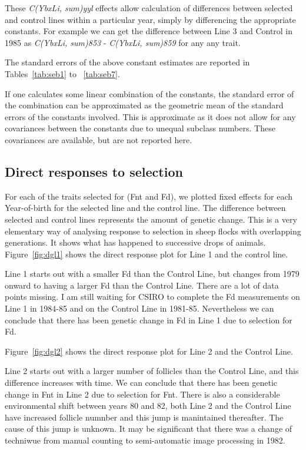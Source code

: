 \documentclass[titlepage]{article}  %
\begin{document}
These {\em C(YbxLi, sum)yyl} effects allow calculation of differences between selected and control lines within a particular year, simply by differencing the appropriate constants. For example we can get the difference between Line 3 and Control in 1985 as {\em C(YbxLi, sum)853} - {\em C(YbxLi, sum)859} for any any trait. 

The standard errors of the above constant estimates are reported in Tables~\ref{tab:seb1} to ~\ref{tab:seb7}.








If one calculates some linear combination of the constants, the standard error of the combination can be approximated as the geometric mean of the standard errors of the constants involved. This is approximate as it does not allow for any covariances between the constants due to unequal subclass numbers. These covariances are available, but are not reported here.

\subsection{Direct responses to selection}
For each of the traits selected for (Fnt and Fd),   we plotted fixed effects for each Year-of-birth for the selected line and the control line. The difference between selected and control lines represents the amount of genetic change.  This is a very elementary way of analysing response to selection in sheep flocks with overlapping generations. It shows what has happened to successive drops of animals. Figure~\ref{fig:dgl1} shows the direct response plot for Line 1 and the control line.



 Line 1 starts out with a smaller Fd than the Control Line, but changes from 1979 onward to having a larger Fd than the Control Line. There are a lot of data points missing. I am still waiting for CSIRO to complete the Fd measurements on Line 1 in 1984-85 and on the Control Line in 1981-85. Nevertheless we can conclude that there has been genetic change in Fd in Line 1 due to selection for Fd.

Figure~\ref{fig:dgl2} shows the direct response plot for Line 2 and the Control Line.


Line 2 starts out with a larger number of follicles than the Control Line, and this difference increases with time. We can conclude that there has been genetic change in Fnt in Line 2 due to selection for Fnt. There is also a considerable environmental shift between years 80 and 82, both Line 2 and the Control Line have increased follicle numnber and this jump is manintained thereafter. The cause of this jump is unknown. It may be significant that there was a change of techniwue from manual counting to semi-automatic image processing in 1982.
\end{document}

